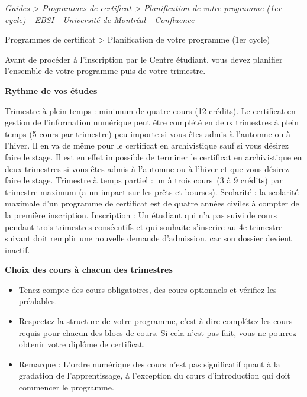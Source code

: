 \documentclass [12 pt]{article}
\begin{document}
        
        
        \textit{
        Guides > Programmes de certificat > Planification de votre programme (1er
            cycle) - EBSI - Université de Montréal - Confluence
        }
    
        Programmes de certificat > Planification de votre programme (1er cycle)
        
            Avant de procéder à l'inscription par le Centre étudiant, vous devez planifier
                l'ensemble de votre programme puis de votre trimestre.
            
        \textbf{
        Rythme de vos études
        }
    
            Trimestre à plein temps : minimum de quatre cours (12 crédits).
            Le certificat en gestion de l'information numérique peut être complété en deux
                trimestres à plein temps (5 cours par trimestre) peu importe si vous êtes admis à
                l'automne ou à l'hiver. Il en va de même pour le certificat en archivistique sauf si
                vous désirez faire le stage. Il est en effet impossible de terminer le certificat en
                archivistique en deux trimestres si vous êtes admis à l'automne ou à l'hiver et que
                vous désirez faire le stage.
            Trimestre à temps partiel : un à trois cours (3 à 9 crédits)
                par trimestre maximum (a un impact sur les prêts et bourses).
            Scolarité : la scolarité maximale d'un programme de certificat est
                de quatre années civiles à compter de la première inscription.
            Inscription : Un étudiant qui n'a pas suivi de cours pendant trois
                trimestres consécutifs et qui souhaite s'inscrire au 4e trimestre suivant
                doit remplir une nouvelle demande d'admission, car son dossier devient inactif.
            
        \textbf{
        Choix des cours à chacun des trimestres
        }
    
            
        \begin{itemize}
        
                
        \item Tenez compte des cours obligatoires, des cours optionnels et vérifiez les
                    préalables.
                
        \item Respectez la structure de votre programme, c'est-à-dire complétez les cours
                    requis pour chacun des blocs de cours. Si cela n'est pas fait, vous ne pourrez
                    obtenir votre diplôme de certificat.
                
        \item Remarque : L'ordre numérique des cours n'est pas significatif quant à
                    la gradation de l'apprentissage, à l'exception du cours d'introduction qui doit
                    commencer le programme.
            
        \end{itemize}
    
\end{document}
